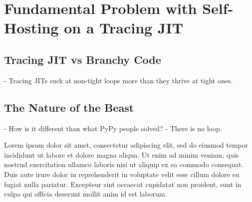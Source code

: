 \chapter{Fundamental Problem with Self-Hosting on a Tracing JIT}

	\section{Tracing JIT vs Branchy Code}
		- Tracing JITs suck at non-tight loops more than they thrive at tight ones.
	\section{The Nature of the Beast}
		- How is it different than what PyPy people solved?
		- There is no loop.


Lorem ipsum dolor sit amet, consectetur adipiscing elit, sed do eiusmod tempor incididunt ut labore et dolore magna aliqua. Ut enim ad minim veniam, quis nostrud exercitation ullamco laboris nisi ut aliquip ex ea commodo consequat. Duis aute irure dolor in reprehenderit in voluptate velit esse cillum dolore eu fugiat nulla pariatur. Excepteur sint occaecat cupidatat non proident, sunt in culpa qui officia deserunt mollit anim id est laborum.
